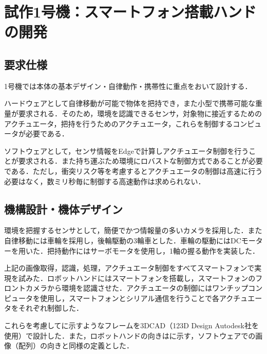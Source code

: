 \chapter{試作1号機：スマートフォン搭載ハンドの開発}
\newpage

\section{要求仕様}

1号機では本体の基本デザイン・自律動作・携帯性に重点をおいて設計する．

ハードウェアとして自律移動が可能で物体を把持でき，また小型で携帯可能な重量が要求される．そのため，環境を認識できるセンサ，対象物に接近するためのアクチュエータ，把持を行うためのアクチュエータ，これらを制御するコンピュータが必要である．

ソフトウェアとして，センサ情報をEdgeで計算しアクチュエータ制御を行うことが要求される．また持ち運ぶため環境にロバストな制御方式であることが必要である．ただし，衝突リスク等を考慮するとアクチュエータの制御は高速に行う必要はなく，数ミリ秒毎に制御する高速動作は求められない．


\section{機構設計・機体デザイン}
環境を把握するセンサとして，簡便でかつ情報量の多いカメラを採用した．また自律移動には車輪を採用し，後輪駆動の3輪車とした．車輪の駆動にはDCモーターを用いた．把持動作にはサーボモータを使用し，1軸の握る動作を実装した．

上記の画像取得，認識，処理，アクチュエータ制御をすべてスマートフォンで実現を試みた．ロボットハンドにはスマートフォンを搭載し，スマートフォンのフロントカメラから環境を認識させた．アクチュエータの制御にはワンチップコンピュータを使用し，スマートフォンとシリアル通信を行うことで各アクチュエータをそれぞれ制御した．

これらを考慮してに示すようなフレームを3DCAD（123D Design Autodesk社を使用）で設計した．また，ロボットハンドの向きはに示す，ソフトウェアでの画像（配列）の向きと同様の定義とした．

